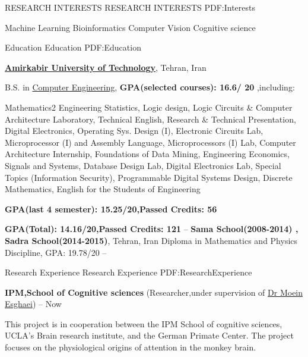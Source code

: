 \documentclass[letterpaper,MMMyyyy,nonstopmode]{simpleresumecv}
\begin{document}
\begin{Body}

\Section
{RESEARCH INTERESTS}
{RESEARCH INTERESTS}
{PDF:Interests}

\Entry

\BulletItem
Machine Learning
\BulletItem
Bioinformatics
\BulletItem
Computer Vision
\BulletItem
Cognitive science




\Section
{Education}
{Education}
{PDF:Education}

\Entry
\href{http://www.aut.ac.ir}
{\textbf{Amirkabir University of Technology}},
Tehran, Iran

\Gap
\BulletItem
B.S. in
\href{http://ceit.aut.ac.ir}
{Computer Engineering}, 
 \BulletItem
 \textbf {GPA(selected courses): 16.6/ 20} ,including:
 
Mathematics2
Engineering Statistics,
Logic design,
Logic Circuits & Computer Architecture Laboratory,
Technical English,
Research & Technical Presentation,
Digital Electronics,
Operating Sys. Design (I),
Electronic Circuits Lab,
Microprocessor (I) and Assembly Language,
Microprocessors (I) Lab,
Computer Architecture Internship,
Foundations of Data Mining,
Engineering Economics,
Signals and Systems,
Database Design Lab,
Digital Electronics Lab,
Special Topics (Information Security),
Programmable Digital Systems Design,
Discrete Mathematics,
English for the Students of Engineering

\Gap
\newline

\BulletItem
  \textbf {GPA(last 4 semester): 15.25/20,Passed Credits: 56}
 
 \BulletItem
 \textbf {GPA(Total): 14.16/20,Passed Credits: 121}
\hfill
{} --  
\href{}
\Entry
{\textbf{Sama School(2008-2014) , Sadra School(2014-2015)}},
Tehran, Iran
\BulletItem
Diploma in Mathematics and Physics Discipline, 
GPA: 19.78/20
\hfill
{}--

\begin{Detail}

\end{Detail}


\BullENCE %

\Section
{Research Experience}
{Research Experience}
{PDF:ResearchExperience}

\Entry
\href{}
\BulletItem
{\textbf{IPM,School of Cognitive sciences}} 
\newline (Researcher,under supervision of \href{https://scholar.google.de/citations?user=H3AwrOAAAAAJ&hl=en}{Dr Moein Esghaei})
\hfill
{} --
Now
\begin{Detail}
\SubBulletItem
This project is in cooperation between the IPM School of cognitive sciences, UCLA’s Brain research institute, and the German Primate Center. The project focuses on the physiological origins of attention in the monkey brain.  
\end{Detail}



\end{Body}
\end{document}
